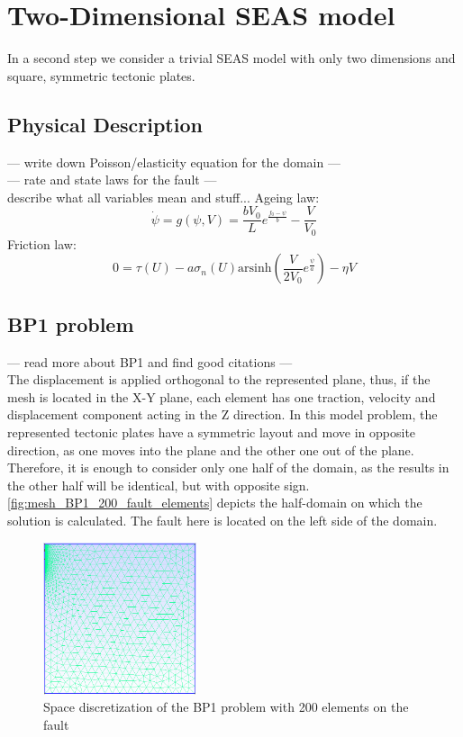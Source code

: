 
\chapter{Two-Dimensional SEAS model}
In a second step we consider a trivial SEAS model with only two dimensions and square, symmetric tectonic plates.

\section{Physical Description}
\label{ssec:physicalDescriptionSEAS2D}
--- write down Poisson/elasticity equation for the domain --- \\
--- rate and state laws for the fault --- \\
describe what all variables mean and stuff...
Ageing law: 
\begin{equation}
    \dot{\psi} = g(\psi, V) = \frac{bV_0}{L}e^{\frac{f_0 - \psi}{b}} - \frac{V}{V_0}
\end{equation}
Friction law: 
\begin{equation}
    0 = \tau(U) - a\sigma_n(U) \text{arsinh}\left(\frac{V}{2V_0}e^{\frac{\psi}{a}}\right) - \eta V
\end{equation}


\section{BP1 problem}
--- read more about BP1 and find good citations --- \\
The displacement is applied orthogonal to the represented plane, thus, if the mesh is located in the X-Y plane, each element has one traction, velocity and displacement component acting in the Z direction. In this model problem, the represented tectonic plates have a symmetric layout and move in opposite direction, as one moves into the plane and the other one out of the plane. Therefore, it is enough to consider only one half of the domain, as the results in the other half will be identical, but with opposite sign. \autoref{fig:mesh_BP1_200_fault_elements} depicts the half-domain on which the solution is calculated. The fault here is located on the left side of the domain.
\begin{figure}[H]
    \centering
    \includegraphics[width=0.4\textwidth]{images/BP1_MESH_200.png}
    \caption{Space discretization of the BP1 problem with 200 elements on the fault}
    \label{fig:mesh_BP1_200_fault_elements}
\end{figure}

